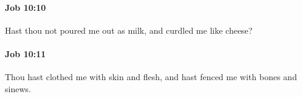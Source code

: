 		\paragraph{Job 10:10} %
			\label{JOB-10-10}

			Hast thou not poured me out as milk, and curdled me like cheese?


		\paragraph{Job 10:11} %
			\label{JOB-10-11}

			Thou hast clothed me with skin and flesh, and hast fenced me with bones and sinews.


